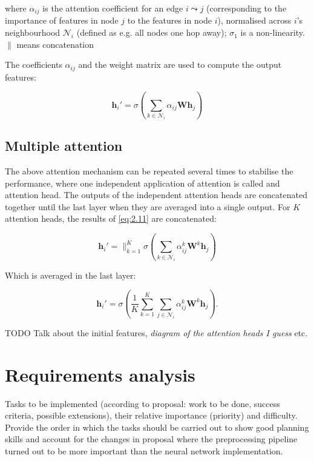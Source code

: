 where $\alpha_{ij}$ is the attention coefficient for an edge $i\leadsto j$ (corresponding to the importance of features in node $j$ to the features in node $i$), normalised across $i$'s neighbourhood $\mathcal{N}_i$ (defined as e.g. all nodes one hop away); $\sigma_1$ is a non-linearity. $\parallel$ means concatenation

The coefficients $\alpha_{ij}$ and the weight matrix are used to compute the output features:

\begin{equation}
    \mathbf{h}_i' = \sigma(\sum\limits_{k \in \mathcal{N}_i} \alpha_{ij}\mathbf{W}\mathbf{h}_j)\label{eq:2.11}
\end{equation}

\subsection{Multiple attention}
The above attention mechanism can be repeated several times to stabilise the performance, where one independent application of attention is called and attention head. The outputs of the independent attention heads are concatenated together until the last layer when they are averaged into a single output. For $K$ attention heads, the results of \eqref{eq:2.11} are concatenated:

\begin{equation}
    \mathbf{h}_i' = \big\|_{k=1}^{K} \sigma(\sum\limits_{k \in \mathcal{N}_i} \alpha_{ij}^k\mathbf{W}^k\mathbf{h}_j)
\end{equation}

Which is averaged in the last layer:

\begin{equation}
    \mathbf{h}_i' = \sigma(\frac{1}{K}\sum\limits_{k=1}^K\sum\limits_{j \in \mathcal{N}_i} \alpha_{ij}^k\mathbf{W}^k\mathbf{h}_j).
\end{equation}

TODO Talk about the initial features, \textit{diagram of the attention heads I guess} etc.


\section{Requirements analysis}

Tasks to be implemented (according to proposal: work to be done, success criteria, possible extensions), their relative importance (priority) and difficulty. Provide the order in which the tasks should be carried out to show good planning skills and account for the changes in proposal where the preprocessing pipeline turned out to be more important than the neural network implementation.

